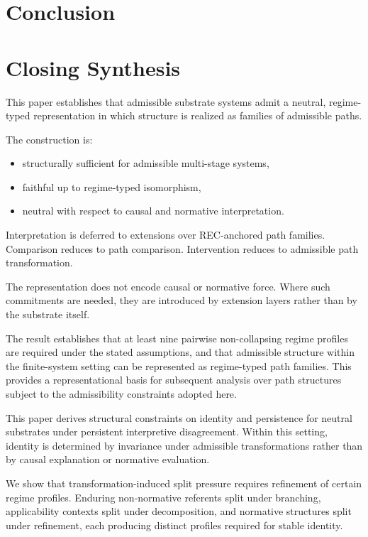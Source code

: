 
\section{Conclusion}
\label{sec:conclusion}

\section{Closing Synthesis}

This paper establishes that admissible substrate systems admit
a neutral, regime-typed representation in which structure is realized
as families of admissible paths.

The construction is:

\begin{itemize}
    \item structurally sufficient for admissible multi-stage systems,
    \item faithful up to regime-typed isomorphism,
    \item neutral with respect to causal and normative interpretation.
\end{itemize}

Interpretation is deferred to extensions over REC-anchored path families.
Comparison reduces to path comparison.
Intervention reduces to admissible path transformation.

The representation does not encode causal or normative force.
Where such commitments are needed, they are introduced by extension layers
rather than by the substrate itself.

The result establishes that at least nine pairwise non-collapsing
regime profiles are required under the stated assumptions, and that
admissible structure within the finite-system setting can be represented
as regime-typed path families.
This provides a representational basis for subsequent analysis over
path structures subject to the admissibility constraints adopted here.

This paper derives structural constraints on identity and persistence
for neutral substrates under persistent interpretive disagreement.
Within this setting, identity is determined by invariance under admissible
transformations rather than by causal explanation or normative evaluation.

We show that transformation-induced split pressure requires refinement
of certain regime profiles.
Enduring non-normative referents split under branching,
applicability contexts split under decomposition,
and normative structures split under refinement,
each producing distinct profiles required for stable identity.



